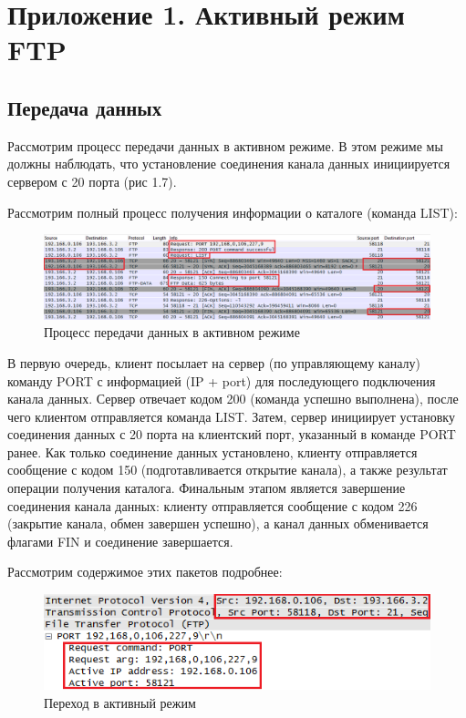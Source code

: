 \documentclass[14pt,a4paper,report]{report}
\begin{document}
\clearpage

\section{Приложение 1. Активный режим FTP}

\subsection{Передача данных}

Рассмотрим процесс передачи данных в активном режиме. В этом режиме мы должны наблюдать, что установление соединения канала данных инициируется сервером с 20 порта (рис 1.7).

Рассмотрим полный процесс получения информации о каталоге (команда LIST):

\begin{figure}[h!]
	\centering
	\includegraphics[scale = 0.60]{images/ftp10.png}
	
	\caption{Процесс передачи данных в активном режиме}
	\label{image:15}
\end{figure}

В первую очередь, клиент посылает на сервер (по управляющему каналу) команду PORT с информацией (IP + port) для последующего подключения канала данных. Сервер отвечает кодом 200 (команда успешно выполнена), после чего клиентом отправляется команда LIST. Затем, сервер инициирует установку соединения данных с 20 порта на клиентский порт, указанный в команде PORT ранее. Как только соединение данных установлено, клиенту отправляется сообщение с кодом 150 (подготавливается открытие канала), а также результат операции получения каталога. Финальным этапом является завершение соединения канала данных: клиенту отправляется сообщение с кодом 226 (закрытие канала, обмен завершен успешно), а канал данных обменивается флагами FIN и соединение завершается.

Рассмотрим содержимое этих пакетов подробнее:

\begin{figure}[h!]
	\centering
	\includegraphics[scale = 0.75]{images/ftp11.png}
	
	\caption{Переход в активный режим}
	\label{image:16}
\end{figure}
\end{document}
